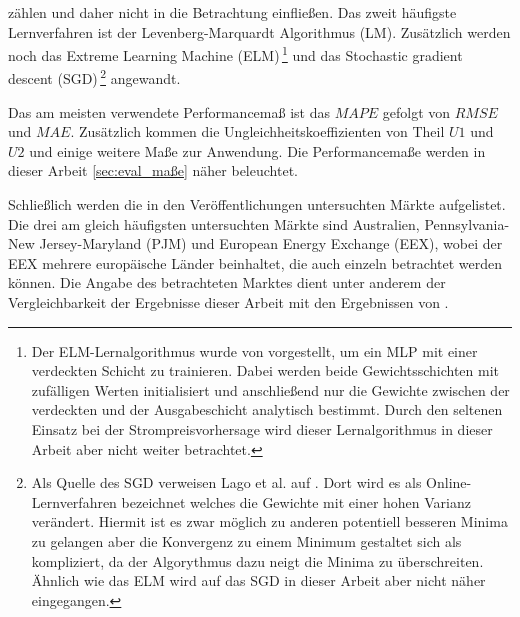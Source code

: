 zählen und daher nicht in die Betrachtung einfließen. Das zweit häufigste Lernverfahren ist der Levenberg-Marquardt Algorithmus (LM). Zusätzlich werden noch das Extreme Learning Machine (ELM)\,\footnote{Der ELM-Lernalgorithmus wurde von \citet{Huang2004} vorgestellt, um ein MLP mit einer verdeckten Schicht zu trainieren. Dabei werden beide Gewichtsschichten mit zufälligen Werten initialisiert und anschließend nur die Gewichte zwischen der verdeckten und der Ausgabeschicht analytisch bestimmt. Durch den seltenen Einsatz bei der Strompreisvorhersage wird dieser Lernalgorithmus in dieser Arbeit aber nicht weiter betrachtet.} und das Stochastic gradient descent (SGD)\,\footnote{Als Quelle des SGD verweisen Lago et al. auf \citet{Ruder2016}. Dort wird es als Online-Lernverfahren bezeichnet welches die Gewichte mit einer hohen Varianz verändert. Hiermit ist es zwar möglich zu anderen potentiell besseren Minima zu gelangen aber die Konvergenz zu einem Minimum gestaltet sich als kompliziert, da der Algorythmus dazu neigt die Minima zu überschreiten. Ähnlich wie das ELM wird auf das SGD in dieser Arbeit aber nicht näher eingegangen.} angewandt. 

Das am meisten verwendete Performancemaß ist das $MAPE$ gefolgt von $RMSE$ und $MAE$. Zusätzlich kommen die Ungleichheitskoeffizienten von Theil $U1$ und $U2$ und einige weitere Maße zur Anwendung. Die Performancemaße werden in dieser Arbeit  \autoref{sec:eval_maße} näher beleuchtet.

Schließlich werden die in den Veröffentlichungen untersuchten Märkte aufgelistet. Die drei am gleich häufigsten untersuchten Märkte sind Australien, Pennsylvania-New Jersey-Maryland (PJM) und European Energy Exchange (EEX), wobei der EEX mehrere europäische Länder beinhaltet, die auch einzeln betrachtet werden können. Die Angabe des betrachteten Marktes dient unter anderem der Vergleichbarkeit der Ergebnisse dieser Arbeit mit den Ergebnissen von \citet{Panapakidis2016}. 







